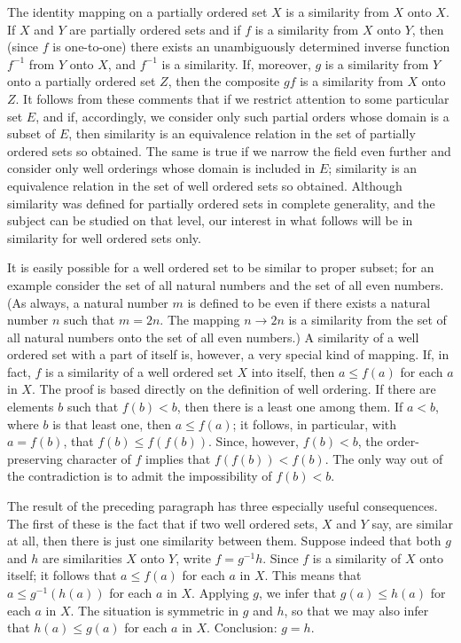 The identity mapping on a partially ordered set $X$ is a similarity from $X$ onto $X$. If $X$ and $Y$ are partially ordered sets and if $f$ is a similarity from $X$ onto $Y$, then (since $f$ is one-to-one) there exists an unambiguously determined inverse function $f^{-1}$ from $Y$ onto $X$, and $f^{-1}$ is a similarity. If, moreover, $g$ is a similarity from $Y$ onto a partially ordered set $Z$, then the composite $gf$ is a similarity from $X$ onto $Z$. It follows from these comments that if we restrict attention to some particular set $E$, and if, accordingly, we consider only such partial orders whose domain is a subset of $E$, then similarity is an equivalence relation in the set of partially ordered sets so obtained. The same is true if we narrow the field even further and consider only well orderings whose domain is included in $E$; similarity is an equivalence relation in the set of well ordered sets so obtained. Although similarity was defined for partially ordered sets in complete generality, and the subject can be studied on that level, our interest in what follows will be in similarity for well ordered sets only. 

It is easily possible for a well ordered set to be similar to proper subset; for an example consider the set of all natural numbers and the set of all even numbers. (As always, a natural number $m$ is defined to be even if there exists a natural number $n$ such that $m = 2n$. The mapping $n \rightarrow 2n$ is a similarity from the set of all natural numbers onto the set of all even numbers.) A similarity of a well ordered set with a part of itself is, however, a very special kind of mapping. If, in fact, $f$ is a similarity of a well ordered set $X$ into itself, then $a \le f(a)$ for each $a$ in $X$. The proof is based directly on the definition of well ordering. If there are elements $b$ such that $f(b) < b$, then there is a least one among them. If $a < b$, where $b$ is that least one, then $a \le f(a)$; it follows, in particular, with $a = f(b)$, that $f(b) \le f(f(b))$. Since, however, $f(b) < b$, the order-preserving character of $f$ implies that $f(f(b)) < f(b)$. The only way out of the contradiction is to admit the impossibility of $f(b) < b$. 

The result of the preceding paragraph has three especially useful consequences. The first of these is the fact that if two well ordered sets, $X$ and $Y$ say, are similar at all, then there is just one similarity between them. Suppose indeed that both $g$ and $h$ are similarities $X$ onto $Y$, write $f = g^{-1}h$. Since $f$ is a similarity of $X$ onto itself; it follows that $a \le f(a)$ for each $a$ in $X$. This means that $a \le g^{-1}(h(a))$ for each $a$ in $X$. Applying $g$, we infer that $g(a) \le h(a)$ for each $a$ in $X$. The situation is symmetric in $g$ and $h$, so that we may also infer that $h(a) \le g(a)$ for each $a$ in $X$. Conclusion: $g = h$. 

